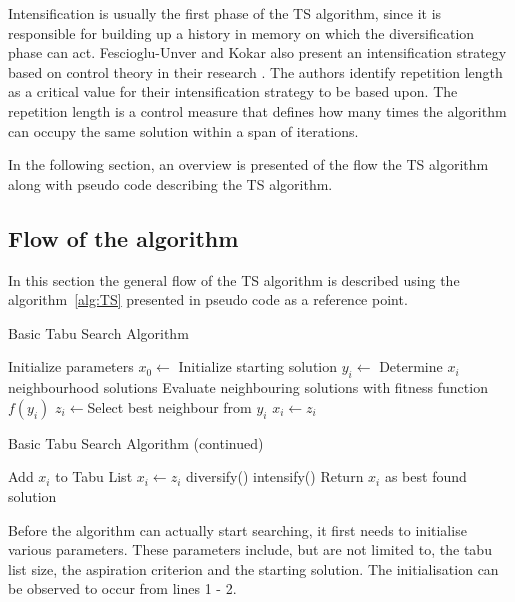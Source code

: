Intensification is usually the first phase of the \gls{TS} algorithm, since it is responsible for building up a history in memory on which the diversification phase can act. Fescioglu-Unver and Kokar also present an intensification strategy based on control theory in their research \cite{SelfControllingReactiveTabu}. The authors identify repetition length as a critical value for their intensification strategy to be based upon. The repetition length is a control measure that defines how many times the algorithm can occupy the same solution within a span of iterations.

In the following section, an overview is presented of the flow the \gls{TS} algorithm along with pseudo code describing the \gls{TS} algorithm.
\subsection{Flow of the algorithm}
In this section the general flow of the \gls{TS} algorithm is described using the algorithm~\ref{alg:TS} presented in pseudo code as a reference point.
\begin{algorithm}[H]
\caption{Basic Tabu Search Algorithm\cite{TabuRCAProblem,TabuMontemanniSmith}}
\label{alg:TS}
	\begin{algorithmic}[1]
		\State Initialize parameters
		\State $x_0 \leftarrow$ Initialize starting solution
			\State $y_i \leftarrow$ Determine $x_i$ neighbourhood solutions 
			\State Evaluate neighbouring solutions with fitness function $f(y_i)$
			\State $z_i \leftarrow$Select best neighbour from $y_i$
					\State $x_i \leftarrow z_i$
				\EndIf
	\end{algorithmic}
\end{algorithm}

\begin{algorithm}[H]
\caption{Basic Tabu Search Algorithm (continued) \cite{TabuRCAProblem,TabuMontemanniSmith}}
\label{alg:TS2}
	\begin{algorithmic}[1]
			\Else
				\State Add $x_i$ to Tabu List
				\State $x_i \leftarrow z_i$
					\State diversify()
				\Else
					\State intensify()
				\EndIf
			\EndIf
		\EndWhile
		\State Return $x_i$ as best found solution
	\end{algorithmic}
\end{algorithm}

Before the algorithm can actually start searching, it first needs to initialise various parameters. These parameters include, but are not limited to, the tabu list size, the aspiration criterion and the starting solution. The initialisation can be observed to occur from lines 1 - 2.

